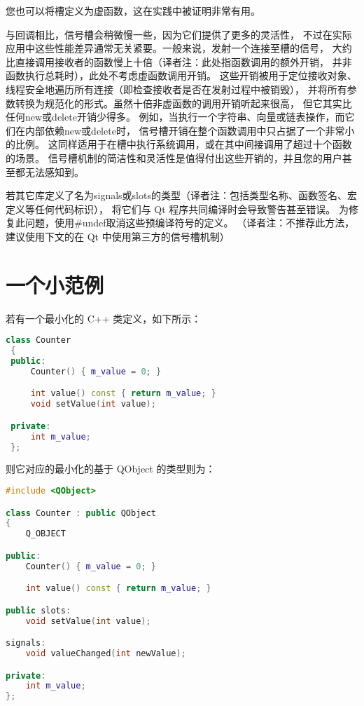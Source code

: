 您也可以将槽定义为虚函数，这在实践中被证明非常有用。

与回调相比，信号槽会稍微慢一些，因为它们提供了更多的灵活性，
不过在实际应用中这些性能差异通常无关紧要。一般来说，发射一个连接至槽的信号，
大约比直接调用接收者的函数慢上十倍（译者注：此处指函数调用的额外开销，
并非函数执行总耗时），此处不考虑虚函数调用开销。
这些开销被用于定位接收对象、线程安全地遍历所有连接（即检查接收者是否在发射过程中被销毁），
并将所有参数转换为规范化的形式。虽然十倍非虚函数的调用开销听起来很高，
但它其实比任何new或delete开销少得多。
例如，当执行一个字符串、向量或链表操作，而它们在内部依赖new或delete时，
信号槽开销在整个函数调用中只占据了一个非常小的比例。
这同样适用于在槽中执行系统调用，或在其中间接调用了超过十个函数的场景。
信号槽机制的简洁性和灵活性是值得付出这些开销的，并且您的用户甚至都无法感知到。

\begin{notice}
若其它库定义了名为signals或slots的类型（译者注：包括类型名称、函数签名、宏定义等任何代码标识），
将它们与 Qt 程序共同编译时会导致警告甚至错误。
为修复此问题，使用\#undef取消这些预编译符号的定义。
（译者注：不推荐此方法，建议使用下文的在 Qt 中使用第三方的信号槽机制）
\end{notice}

\section{一个小范例}

若有一个最小化的 C++ 类定义，如下所示：

\begin{lstlisting}[language=C++]
 class Counter
 {
 public:
     Counter() { m_value = 0; }

     int value() const { return m_value; }
     void setValue(int value);

 private:
     int m_value;
 };
\end{lstlisting}

则它对应的最小化的基于 QObject 的类型则为：

\begin{lstlisting}[language=C++]
 #include <QObject>

class Counter : public QObject
{
	Q_OBJECT

public:
	Counter() { m_value = 0; }

	int value() const { return m_value; }

public slots:
	void setValue(int value);

signals:
	void valueChanged(int newValue);

private:
	int m_value;
};
\end{lstlisting}

